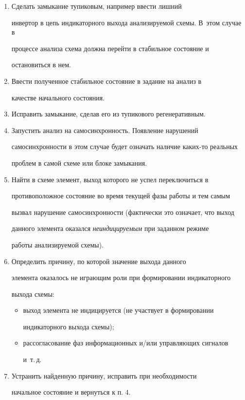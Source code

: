       \begin{enumerate}[1.]


      \item Сделать замыкание тупиковым, например ввести лишний 


инвертор в цепь индикаторного выхода анализируемой схемы. В~этом случае в 


процессе анализа схема должна  перейти в стабильное состояние и 


остановиться в нем.


      \item Ввести полученное стабильное состояние в задание на анализ в 


качестве начального состояния.


      \item Исправить замыкание, сделав его из тупикового регенеративным.


      \item Запустить анализ на самосинхронность. Появление нарушений 


самосинхронности в этом случае будет означать наличие каких-то реальных 


проблем в самой схеме или блоке замыкания.


      \item Найти в схеме элемент, выход которого не успел переключиться в 


противоположное состояние во время текущей фазы работы и тем самым 


вызвал нарушение самосинхронности (фактически это означает, что выход 


данного элемента оказался \textit{неиндицируемым} при заданном режиме 


работы анализируемой схемы). 


      \item Определить причину, по которой значение выхода данного 


элемента оказалось не играющим роли при формировании индикаторного 


выхода схемы: 


      \begin{itemize}


\item выход элемента не индицируется (не участвует в формировании 


индикаторного выхода схемы);


\item рассогласование фаз информационных и/или управляющих сигналов 


и~т.\,д.


\end{itemize}


      \item Устранить найденную причину, исправить при необходимости 


начальное состояние и вернуться к п. 4.


      \end{enumerate}



